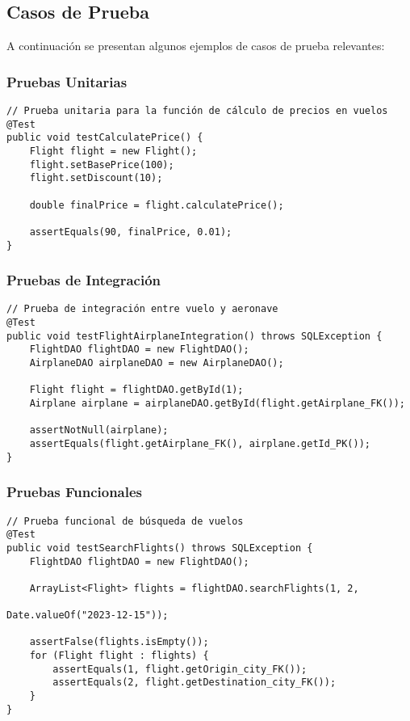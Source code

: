 \documentclass[12pt,a4paper]{article}
\begin{document}
\subsection{Casos de Prueba}

A continuación se presentan algunos ejemplos de casos de prueba relevantes:

\subsubsection{Pruebas Unitarias}

\begin{verbatim}
// Prueba unitaria para la función de cálculo de precios en vuelos
@Test
public void testCalculatePrice() {
    Flight flight = new Flight();
    flight.setBasePrice(100);
    flight.setDiscount(10);

    double finalPrice = flight.calculatePrice();

    assertEquals(90, finalPrice, 0.01);
}
\end{verbatim}

\subsubsection{Pruebas de Integración}

\begin{verbatim}
// Prueba de integración entre vuelo y aeronave
@Test
public void testFlightAirplaneIntegration() throws SQLException {
    FlightDAO flightDAO = new FlightDAO();
    AirplaneDAO airplaneDAO = new AirplaneDAO();

    Flight flight = flightDAO.getById(1);
    Airplane airplane = airplaneDAO.getById(flight.getAirplane_FK());

    assertNotNull(airplane);
    assertEquals(flight.getAirplane_FK(), airplane.getId_PK());
}
\end{verbatim}

\subsubsection{Pruebas Funcionales}

\begin{verbatim}
// Prueba funcional de búsqueda de vuelos
@Test
public void testSearchFlights() throws SQLException {
    FlightDAO flightDAO = new FlightDAO();

    ArrayList<Flight> flights = flightDAO.searchFlights(1, 2,
                                                       Date.valueOf("2023-12-15"));

    assertFalse(flights.isEmpty());
    for (Flight flight : flights) {
        assertEquals(1, flight.getOrigin_city_FK());
        assertEquals(2, flight.getDestination_city_FK());
    }
}
\end{verbatim}
\end{document}
